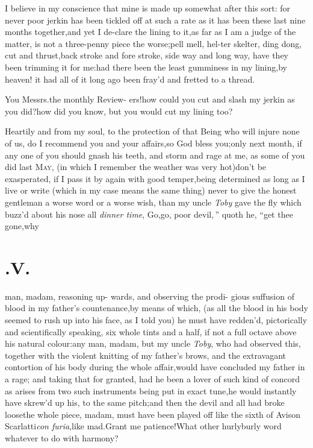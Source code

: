 \documentclass{article}
\begin{document}
I believe in my conscience that mine is made up somewhat after
this sort:\tsh\break
for never poor jerkin has been tickled\break
off at such a rate as it has been these last nine months
together,\tsk and yet I de-\break clare the lining to
it,\tsk as far as I am a judge of the
matter, is not a three-penny piece the worse;\tsk pell mell,
hel-\break ter skelter, ding dong, cut and thrust,\break back stroke and fore
stroke, side way and long way, have they been trimming it for
me:\tsk had there been the least gumminess in my lining,\tsk by
heaven! it had all of it long ago been fray’d and\break
fretted to a thread.

\tsk You Messrs.\@ the monthly
Review- ers!\tsh how could you cut and slash my jerkin as
you did?\tsh how did you know, but you would cut my lining
too?

Heartily and from my soul, to the protection of that Being who
will injure none of us, do I recommend you and your
affairs,\tsk so God bless you;\tsk only next month, if any one
of you should gnash his teeth, and storm and rage at me, as some of
you did last \textsc{May}, (in which I remember the weather
was very hot)\tsk don’t be exasperated, if I pass it by
again with good temper,\tsk being determined as long as I live or
write (which in my case means the same thing) never to give the
honest gentleman a worse word or a worse wish, than my uncle \textit{Toby} gave
the fly which buzz’d about his nose all
\textit{dinner time}, \tsh \lqq Go,\tsh go, poor
devil,\,” quoth he, “\tsh get thee gone,\tsh why

\section{.\quad  V.}

 man, madam, reasoning up-\break 
wards, and observing the prodi-\break
gious suffusion of blood in my
father’s countenance,\tsk by means of which, (as all the
blood in his body seemed to rush up into his face, as I told you) he
must have redden’d, pictorically and scientifically speaking, six
whole tints and a half, if not a full octave above his natural
co\-lour:\tsk any man, madam, but my uncle \textit{Toby}, who had
observed this, together with the violent knitting of my
father’s brows, and the extravagant contortion of his body
during the whole affair,\tsk would have concluded my father in a
rage; and taking that for granted,\tsh{}
had he been a lover of such kind of concord as arises
from two such instruments being put in exact tune,\tsk he would
instantly have skrew’d up his, to the same pitch;\tsk and
then the devil and all had broke loose\tsk the whole piece,
madam, must have been played off like the sixth of Avison
Scarlatti\tsk \textit{con furia},\tsk like mad.\tsk Grant me
patience!\tsh What
\break
other hurlyburly word whatever to do with harmony?
\end{document}
